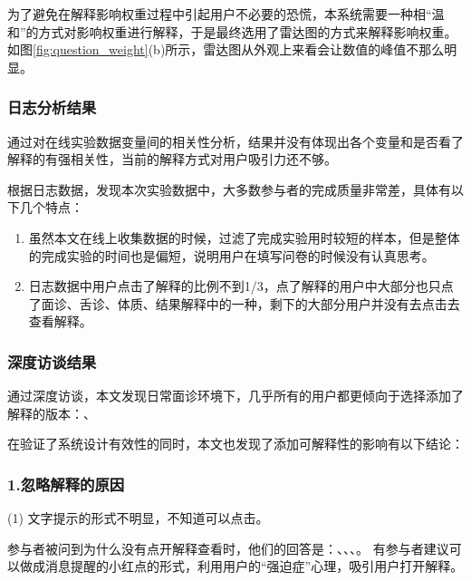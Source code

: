 为了避免在解释影响权重过程中引起用户不必要的恐慌，本系统需要一种相``温和''的方式对影响权重进行解释，于是最终选用了雷达图的方式来解释影响权重。
如图\ref{fig:question_weight}(b)所示，雷达图从外观上来看会让数值的峰值不那么明显。

\subsubsection{日志分析结果}

通过对在线实验数据变量间的相关性分析，结果并没有体现出各个变量和是否看了解释的有强相关性，当前的解释方式对用户吸引力还不够。

根据日志数据，发现本次实验数据中，大多数参与者的完成质量非常差，具体有以下几个特点：
\begin{enumerate}
    \item 虽然本文在线上收集数据的时候，过滤了完成实验用时较短的样本，但是整体的完成实验的时间也是偏短，说明用户在填写问卷的时候没有认真思考。

    \item 日志数据中用户点击了解释的比例不到1/3，点了解释的用户中大部分也只点了面诊、舌诊、体质、结果解释中的一种，剩下的大部分用户并没有去点击去查看解释。
\end{enumerate}

\subsubsection{深度访谈结果}

通过深度访谈，本文发现日常面诊环境下，几乎所有的用户都更倾向于选择添加了解释的版本：、

在验证了系统设计有效性的同时，本文也发现了添加可解释性的影响有以下结论：

\subsubsection{1.忽略解释的原因}
(1) 文字提示的形式不明显，不知道可以点击。

参与者被问到为什么没有点开解释查看时，他们的回答是：、、、。
有参与者建议可以做成消息提醒的小红点的形式，利用用户的“强迫症”心理，吸引用户打开解释。

